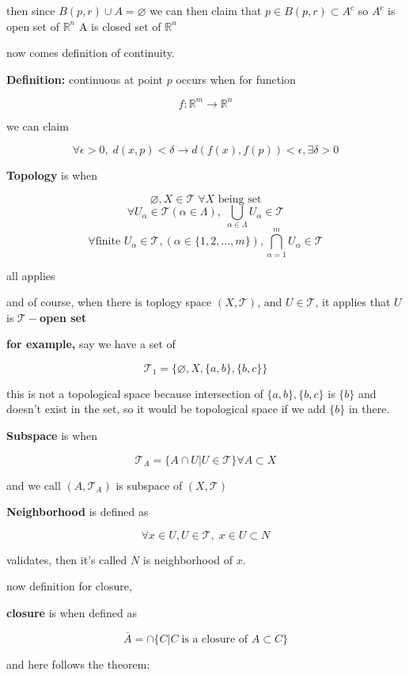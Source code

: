 \documentclass{article}
\begin{document}
then since $B(p,r)\cup A=\varnothing$ we can then claim that $p\in B(p,r)\subset A^c$ so $A^c$ is open set of $\mathbb{R}^n$ A is closed set of $\mathbb{R}^n$

now comes definition of continuity.

\textbf{Definition:} continuous at point $p$ occurs when for function

\[
f:\mathbb{R}^m \rightarrow \mathbb{R}^n
\]

we can claim 

\[
\forall \epsilon>0, \;d(x,p)<\delta \rightarrow d(f(x),f(p))<\epsilon, \exists \delta>0
\]

\textbf{Topology} is when

\[
\varnothing, X\in \mathcal{T} \; \forall X \text{ being set}
\]
\[
\forall U_\alpha\in\mathcal{T}(\alpha\in \Lambda), \; \bigcup_{\alpha\in \Lambda}U_\alpha \in \mathcal{T}
\]
\[
\forall \text{finite } U_\alpha \in \mathcal{T},(\alpha\in\{1,2,...,m\}), \bigcap_{\alpha=1}^{m} U_\alpha\in \mathcal{T}
\]

all applies

and of course, when there is toplogy space $(X,\mathcal{T})$, and $U\in \mathcal{T}$, it applies that $U$ is \textbf{$\mathcal{T}-$open set}

\textbf{for example,} say we have a set of 

\[
\mathcal{T}_1=\{\varnothing, X, \{a,b\}, \{b,c\}\}
\]

this is not a topological space because intersection of $\{a,b\}, \{b,c\}$ is $\{b\}$ and doesn't exist in the set, so it would be topological space if we add $\{b\}$ in there.

\textbf{Subspace} is when

\[
\mathcal{T}_A=\{A\cap U| U\in \mathcal{T}\} \forall A\subset X
\]

and we call $(A,\mathcal{T}_A)$ is subspace of $(X,\mathcal{T})$

\textbf{Neighborhood} is defined as 

\[
\forall x\in U, U\in \mathcal{T}, \; x\in U \subset N 
\]

validates, then it's called $N$ is neighborhood of $x$.

now definition for closure,

\textbf{closure} is when defined as

\[
\bar{A} = \cap \{C|C \; \text{is a closure of } A\subset C\}
\]

and here follows the theorem:
\end{document}
